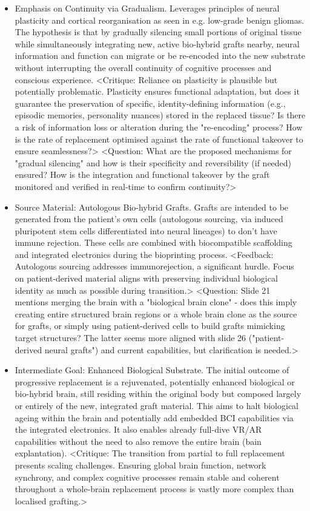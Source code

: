\documentclass[10pt]{article}
\begin{document}
\begin{sloppypar}
\begin{itemize}
    \item Emphasis on Continuity via Gradualism. Leverages principles of neural plasticity and cortical reorganisation as seen in e.g. low-grade benign gliomas. The hypothesis is that by gradually silencing small portions of original tissue while simultaneously integrating new, active bio-hybrid grafts nearby, neural information and function can migrate or be re-encoded into the new substrate without interrupting the overall continuity of cognitive processes and conscious experience. <Critique: Reliance on plasticity is plausible but potentially problematic. Plasticity ensures functional adaptation, but does it guarantee the preservation of specific, identity-defining information (e.g., episodic memories, personality nuances) stored in the replaced tissue? Is there a risk of information loss or alteration during the "re-encoding" process? How is the rate of replacement optimised against the rate of functional takeover to ensure seamlessness?> <Question: What are the proposed mechanisms for "gradual silencing" and how is their specificity and reversibility (if needed) ensured? How is the integration and functional takeover by the graft monitored and verified in real-time to confirm continuity?>

    \item Source Material: Autologous Bio-hybrid Grafts. Grafts are intended to be generated from the patient's own cells (autologous sourcing, via induced pluripotent stem cells differentiated into neural lineages) to don't have immune rejection. These cells are combined with biocompatible scaffolding and integrated electronics during the bioprinting process. <Feedback: Autologous sourcing addresses immunorejection, a significant hurdle. Focus on patient-derived material aligns with preserving individual biological identity as much as possible during transition.> <Question: Slide 21 mentions merging the brain with a "biological brain clone" - does this imply creating entire structured brain regions or a whole brain clone as the source for grafts, or simply using patient-derived cells to build grafts mimicking target structures? The latter seems more aligned with slide 26 ("patient-derived neural grafts") and current capabilities, but clarification is needed.>

    \item Intermediate Goal: Enhanced Biological Substrate. The initial outcome of progressive replacement is a rejuvenated, potentially enhanced biological or bio-hybrid brain, still residing within the original body but composed largely or entirely of the new, integrated graft material. This aims to halt biological ageing within the brain and potentially add embedded BCI capabilities via the integrated electronics. It also enables already full-dive VR/AR capabilities without the need to also remove the entire brain (bain explantation). <Critique: The transition from partial to full replacement presents scaling challenges. Ensuring global brain function, network synchrony, and complex cognitive processes remain stable and coherent throughout a whole-brain replacement process is vastly more complex than localised grafting.>


\end{itemize}
\end{sloppypar}
\end{document}
